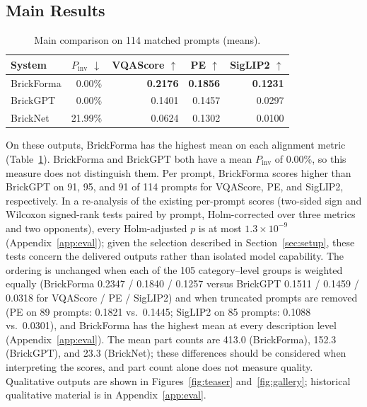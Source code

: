 \documentclass[letterpaper]{article} %
\begin{document}
\subsection{Main Results}
\begin{table}[t]
\centering
\small
\setlength{\tabcolsep}{4pt}
\begin{tabular}{lrrrr}
\toprule
System & $P_{\mathrm{inv}}$ $\downarrow$ & VQAScore $\uparrow$ & PE $\uparrow$ & SigLIP2 $\uparrow$ \\
\midrule
BrickForma & 0.00\% & \textbf{0.2176} & \textbf{0.1856} & \textbf{0.1231} \\
BrickGPT & 0.00\% & 0.1401 & 0.1457 & 0.0297 \\
BrickNet & 21.99\% & 0.0624 & 0.1302 & 0.0100 \\
\bottomrule
\end{tabular}
\caption{Main comparison on 114 matched prompts (means).}
\label{tab:main}
\end{table}
On these outputs, BrickForma has the highest mean on each alignment metric (Table~\ref{tab:main}). BrickForma and BrickGPT both have a mean $P_{\mathrm{inv}}$ of 0.00\%, so this measure does not distinguish them. Per prompt, BrickForma scores higher than BrickGPT on 91, 95, and 91 of 114 prompts for VQAScore, PE, and SigLIP2, respectively. In a re-analysis of the existing per-prompt scores (two-sided sign and Wilcoxon signed-rank tests paired by prompt, Holm-corrected over three metrics and two opponents), every Holm-adjusted $p$ is at most $1.3{\times}10^{-9}$ (Appendix~\ref{app:eval}); given the selection described in Section~\ref{sec:setup}, these tests concern the delivered outputs rather than isolated model capability. The ordering is unchanged when each of the 105 category--level groups is weighted equally (BrickForma 0.2347 / 0.1840 / 0.1257 versus BrickGPT 0.1511 / 0.1459 / 0.0318 for VQAScore / PE / SigLIP2) and when truncated prompts are removed (PE on 89 prompts: 0.1821 vs.\ 0.1445; SigLIP2 on 85 prompts: 0.1088 vs.\ 0.0301), and BrickForma has the highest mean at every description level (Appendix~\ref{app:eval}). The mean part counts are 413.0 (BrickForma), 152.3 (BrickGPT), and 23.3 (BrickNet); these differences should be considered when interpreting the scores, and part count alone does not measure quality. Qualitative outputs are shown in Figures~\ref{fig:teaser} and~\ref{fig:gallery}; historical qualitative material is in Appendix~\ref{app:eval}.
\end{document}
